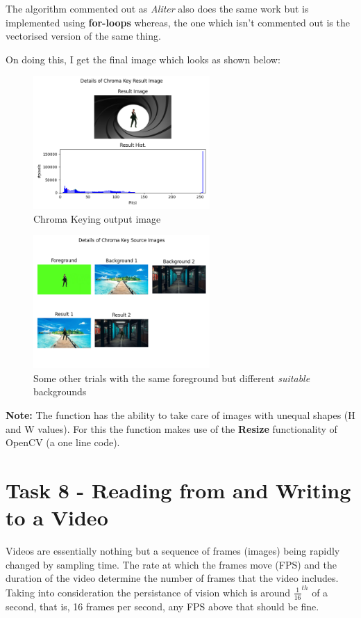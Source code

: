\documentclass[notitlepage]{report}
\begin{document}
The algorithm commented out as \textit{Aliter} also does the same work but is implemented using \textbf{for-loops} whereas, 
the one which isn't commented out is the vectorised version of the same thing.

On doing this, I get the final image which looks as shown below:

\begin{figure}[htp]
    \centering
    \hypertarget{CK_out}{\includegraphics[width = 0.6\textwidth]{CK_out.png}}
    \caption{Chroma Keying output image}
    \label{fig15:sysfig}
\end{figure}

\begin{figure}[htp]
    \centering
    \hypertarget{CK_out}{\includegraphics[width = 0.6\textwidth]{CK_Extras.png}}
    \caption{Some other trials with the same foreground but different \textit{suitable} backgrounds}
    \label{fig16:sysfig}
\end{figure}

\textbf{Note:} The function has the ability to take care of images with unequal shapes (H and W values). For this
the function makes use of the \textbf{Resize} functionality of OpenCV (a one line code).

\section{Task 8 - Reading from and Writing to a Video}
Videos are essentially nothing but a sequence of frames (images) being rapidly changed by sampling time. The rate at which the frames move (FPS)
and the duration of the video determine the number of frames that the video includes. Taking into consideration the persistance of vision which is around
$\frac{1}{16}^{th}$ of a second, that is, 16 frames per second, any FPS above that should be fine. 
\end{document}
